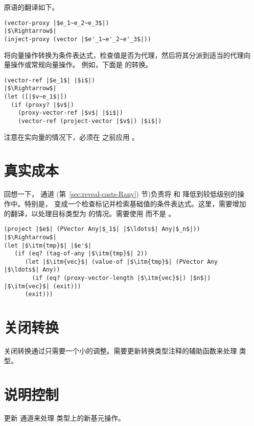 \documentclass[11pt]{book}
\begin{document}
  原语的翻译如下。
\begin{lstlisting}
(vector-proxy |$e_1~e_2~e_3$|)
|$\Rightarrow$|
(inject-proxy (vector |$e'_1~e'_2~e'_3$|))
\end{lstlisting}

将向量操作转换为条件表达式，检查值是否为代理，然后将其分派到适当的代理向量操作或常规向量操作。
例如，下面是  的转换。
\begin{lstlisting}
(vector-ref |$e_1$| |$i$|)
|$\Rightarrow$|
(let ([|$v~e_1$|])
  (if (proxy? |$v$|)
    (proxy-vector-ref |$v$| |$i$|)
    (vector-ref (project-vector |$v$|) |$i$|)
\end{lstlisting}
注意在实向量的情况下，必须在  之前应用  。

\section{真实成本}
\label{sec:reveal-casts-gradual}

回想一下，  通道
(第~\ref{sec:reveal-casts-Rany}) 节)负责将
 和  降低到较低级别的操作中。特别是，  变成一个检查标记并检索基础值的条件表达式。这里，需要增加  的翻译，以处理目标类型为  的情况。需要使用  而不是  。
\begin{lstlisting}
(project |$e$| (PVector Any|$_1$| |$\ldots$| Any|$_n$|))
|$\Rightarrow$|
(let |$\itm{tmp}$| |$e'$|
   (if (eq? (tag-of-any |$\itm{tmp}$| 2))
      (let |$\itm{vec}$| (value-of |$\itm{tmp}$| (PVector Any |$\ldots$| Any))
        (if (eq? (proxy-vector-length |$\itm{vec}$|) |$n$|) |$\itm{vec}$| (exit)))
      (exit)))
\end{lstlisting}


\section{关闭转换}
\label{sec:closure-conversion-gradual}

关闭转换通过只需要一个小的调整。需要更新转换类型注释的辅助函数来处理  类型。

\section{说明控制}
\label{sec:explicate-control-gradual}

更新  通道来处理  类型上的新基元操作。
\end{document}
